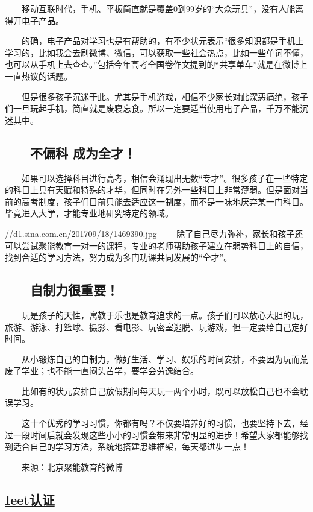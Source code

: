 \documentclass[11pt]{ctexart}
\begin{document}
{{{{　　移动互联时代，手机、平板简直就是覆盖0到99岁的“大众玩具”，没有人能离得开电子产品。

　　的确，电子产品对学习也是有帮助的，有不少状元表示“很多知识都是手机上学习的，比如我会去刷微博、微信，可以获取一些社会热点，比如一些单词不懂，也可以从手机上去查查。”包括今年高考全国卷作文提到的“共享单车”就是在微博上一直热议的话题。

　　但是很多孩子沉迷于此。尤其是手机游戏，相信不少家长对此深恶痛绝，孩子们一旦玩起手机，简直就是废寝忘食。所以一定要适当使用电子产品，千万不能沉迷其中。

\subsection{　　不偏科 成为全才！}
\label{sec:org4c71f52}

　　如果可以选择科目进行高考，相信会涌现出无数“专才”。很多孩子在一些特定的科目上具有天赋和特殊的才华，但同时在另外一些科目上非常薄弱。但是面对当前的高考制度，孩子们目前只能去适应这一制度，而不是一味地厌弃某一门科目。毕竟进入大学，才能专业地研究特定的领域。

//d1.sina.com.cn/201709/18/1469390.jpg
　　除了自己尽力弥补，家长和孩子还可以尝试聚能教育一对一的课程，专业的老师帮助孩子建立在弱势科目上的自信，找到合适的学习方法，努力成为多门功课共同发展的“全才”。

\subsection{　　自制力很重要！}
\label{sec:orgfaf049a}

　　玩是孩子的天性，寓教于乐也是教育追求的一点。孩子们可以放心大胆的玩，旅游、游泳、打篮球、摄影、看电影、玩密室逃脱、玩游戏，但一定要给自己定好时间。

　　从小锻炼自己的自制力，做好生活、学习、娱乐的时间安排，不要因为玩而荒废了学业；也不能一直闷头苦学，要学会劳逸结合。

　　比如有的状元安排自己放假期间每天玩一两个小时，既可以放松自己也不会耽误学习。

　　这十个优秀的学习习惯，你都有吗？不仅要培养好的习惯，也要坚持下去，经过一段时间后就会发现这些小小的习惯会带来非常明显的进步！希望大家都能够找到适合自己的学习方法，系统地搭建思维框架，每天都进步一点！

　　来源：北京聚能教育的微博

\subsection{\href{http://www.docin.com/p-1423123129.html}{Ieet认证}}
\label{sec:orgeab6922}
}}}}
\end{document}
